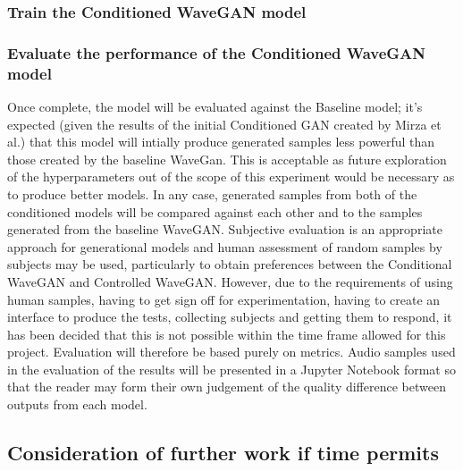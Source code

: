 \documentclass[titlepage]{article}
\begin{document}
\subsubsection{Train the Conditioned WaveGAN model}

\subsubsection{Evaluate the performance of the Conditioned WaveGAN model}

Once complete, the model will be evaluated against the Baseline model; it's expected (given the results of the initial Conditioned GAN created by Mirza et al.) that this model will intially produce generated samples less powerful than those created by the baseline WaveGan.
This is acceptable as future exploration of the hyperparameters out of the scope of this experiment would be necessary as to produce better models.
\newline
\newline
In any case, generated samples from both of the conditioned models will be compared against each other and to the samples generated from the baseline WaveGAN.
\newline
\newline
Subjective evaluation is an appropriate approach for generational models and human assessment of random samples by subjects may be used, particularly to obtain preferences between the Conditional WaveGAN and Controlled WaveGAN.
However, due to the requirements of using human samples, having to get sign off for experimentation, having to create an interface to produce the tests, collecting subjects and getting them to respond, it has been decided that this is not possible within the time frame allowed for this project.
Evaluation will therefore be based purely on metrics.
\newline
\newline
Audio samples used in the evaluation of the results will be presented in a Jupyter Notebook format so that the reader may form their own judgement of the quality difference between outputs from each model.

\subsection{Consideration of further work if time permits}
\end{document}
